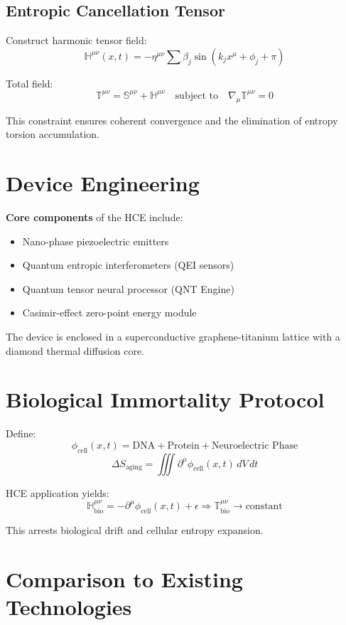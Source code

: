 \documentclass[12pt]{article}
\begin{document}
\subsection{Entropic Cancellation Tensor}
Construct harmonic tensor field:
\[
\mathbb{H}^{\mu\nu}(x, t) = -\eta^{\mu\nu} \sum \beta_j \sin(k_j x^\mu + \phi_j + \pi)
\]

Total field:
\[
\mathbb{T}^{\mu\nu} = \mathbb{S}^{\mu\nu} + \mathbb{H}^{\mu\nu}
\quad \text{subject to} \quad
\nabla_\mu \mathbb{T}^{\mu\nu} = 0
\]

This constraint ensures coherent convergence and the elimination of entropy torsion accumulation.

\section{Device Engineering}
\textbf{Core components} of the HCE include:
\begin{itemize}
    \item Nano-phase piezoelectric emitters
    \item Quantum entropic interferometers (QEI sensors)
    \item Quantum tensor neural processor (QNT Engine)
    \item Casimir-effect zero-point energy module
\end{itemize}

The device is enclosed in a superconductive graphene-titanium lattice with a diamond thermal diffusion core.

\section{Biological Immortality Protocol}
Define:
\[
\phi_{\text{cell}}(x, t) = \text{DNA} + \text{Protein} + \text{Neuroelectric Phase}
\]
\[
\Delta S_{\text{aging}} = \iiint \partial^\mu \phi_{\text{cell}}(x, t) \, dV \, dt
\]

HCE application yields:
\[
\mathbb{H}^{\mu\nu}_{\text{bio}} = -\partial^\mu \phi_{\text{cell}}(x, t) + \epsilon
\Rightarrow \mathbb{T}^{\mu\nu}_{\text{bio}} \rightarrow \text{constant}
\]

This arrests biological drift and cellular entropy expansion.

\section{Comparison to Existing Technologies}
\end{document}
